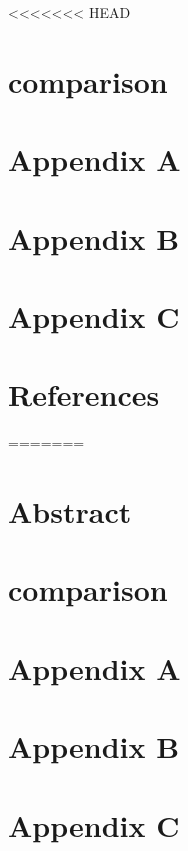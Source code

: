 <<<<<<< HEAD





\maketitle
\vfill

\newpage
\tableofcontents
\newpage


\newpage

\newpage


\newpage

\newpage

\newpage
\section{comparison}
\newpage
\section{Appendix A}
\newpage
\section{Appendix B}
\newpage
\section{Appendix C}
\newpage
\section{References}

=======





\maketitle
\vfill
\section{Abstract}
\newpage
\tableofcontents
\newpage


\newpage

\newpage


\newpage

\newpage

\newpage
\section{comparison}
\newpage
\section{Appendix A}
\newpage
\section{Appendix B}
\newpage
\section{Appendix C}
\newpage


